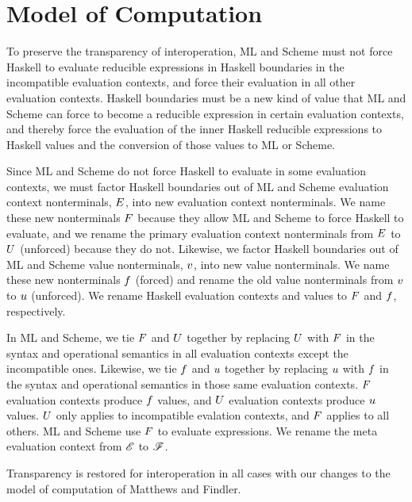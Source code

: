 \section{Model of Computation}

To preserve the transparency of interoperation, ML and Scheme must not force Haskell to evaluate reducible expressions in Haskell boundaries in the incompatible evaluation contexts, and force their evaluation in all other evaluation contexts. Haskell boundaries must be a new kind of value that ML and Scheme can force to become a reducible expression in certain evaluation contexts, and thereby force the evaluation of the inner Haskell reducible expressions to Haskell values and the conversion of those values to ML or Scheme.

Since ML and Scheme do not force Haskell to evaluate in some evaluation contexts, we must factor Haskell boundaries out of ML and Scheme evaluation context nonterminals, $E$, into new evaluation context nonterminals. We name these new nonterminals $F$ because they allow ML and Scheme to force Haskell to evaluate, and we rename the primary evaluation context nonterminals from $E$ to $U$ (unforced) because they do not. Likewise, we factor Haskell boundaries out of ML and Scheme value nonterminals, $v$,  into new value nonterminals. We name these new nonterminals $f$ (forced) and rename the old value nonterminals from $v$ to $u$ (unforced). We rename Haskell evaluation contexts and values to $F$ and $f$, respectively.

In ML and Scheme, we tie $F$ and $U$ together by replacing $U$ with $F$ in the syntax and operational semantics in all evaluation contexts except the incompatible ones. Likewise, we tie $f$ and $u$ together by replacing $u$ with $f$ in the syntax and operational semantics in those same evaluation contexts. $F$ evaluation contexts produce $f$ values, and $U$ evaluation contexts produce $u$ values. $U$ only applies to incompatible evalation contexts, and $F$ applies to all others. ML and Scheme use $F$ to evaluate expressions. We rename the meta evaluation context from $\mathscr{E}$ to $\mathscr{F}$.

Transparency is restored for interoperation in all cases with our changes to the model of computation of Matthews and Findler.


